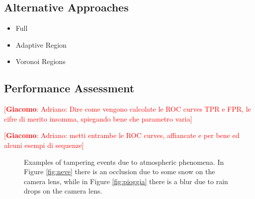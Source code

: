 \documentclass{llncs}
\newcommand{\gi}[1]{{\textcolor{red}{[\small \textbf{Giacomo}: #1]}}}
\begin{document}
\subsection{Alternative Approaches}\label{subsec:AlternativeApproaches}
\begin{itemize}
\item Full
\item Adaptive Region
\item Voronoi Regions
\end{itemize}

\subsection{Performance Assessment}
\gi{Adriano: Dire come vengono calcolate le ROC curves TPR e FPR, le cifre di merito insomma, spiegando bene che parametro varia}

\gi{Adriano: metti entrambe le ROC curves, affiancate e per bene ed alcuni esempi di sequenze}

\begin{figure}
	\centering
	\caption[Tampering examples]{Examples of tampering events due to atmospheric phenomena. In Figure \ref{fig:neve} there is an occlusion due to some snow on the camera lens, while in Figure \ref{fig:pioggia} there is a blur due to rain drops on the camera lens.}
	\label{fig:ROC}
\end{figure}
\end{document}
